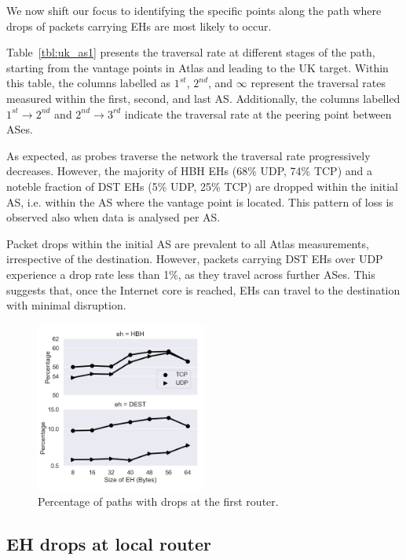 \documentclass[conference]{IEEEtran}
\begin{document}
We now shift our focus to identifying the specific points along the path where
drops of packets carrying EHs are most likely to occur.

Table~\ref{tbl:uk_as1} presents the traversal rate at different stages of the
path, starting from the vantage points in Atlas and leading to the UK target.
Within this table, the columns labelled as $1^{st}$, $2^{nd}$, and $\infty$
represent the traversal rates measured within the first, second, and last AS.
Additionally, the columns labelled $1^{st}\rightarrow 2^{nd}$ and
$2^{nd}\rightarrow 3^{rd}$ indicate the traversal rate at the peering point
between ASes.

As expected, as probes traverse the network the traversal rate
progressively decreases.  However, the majority of HBH EHs (68\% UDP, 74\% TCP)
and a noteble fraction of DST EHs (5\% UDP, 25\% TCP) are dropped within the
initial AS, i.e.  within the AS where the vantage point is located.  This
pattern of loss is observed also when data is analysed per AS.

Packet drops within the initial AS are prevalent to all Atlas measurements,
irrespective of the destination. However, packets carrying DST EHs over UDP
experience a drop rate less than 1\%, as they travel across further ASes.  This
suggests that, once the Internet core is reached, EHs can travel to the
destination with minimal disruption.

\begin{figure}[t]
\centering
  \includegraphics[width=0.5\textwidth]{empty_paths.png}
  \caption{Percentage of paths with drops at the first router.}
  \label{fig:empty_paths}
\end{figure}

\subsection{EH drops at local router}
\end{document}
